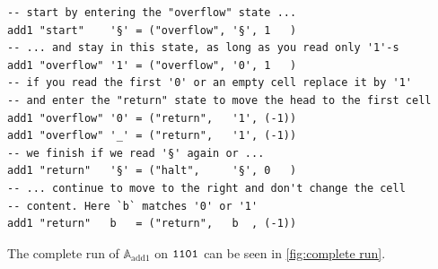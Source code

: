 \begin{lstlisting}
-- start by entering the "overflow" state ...
add1 "start"    '§' = ("overflow", '§', 1   )
-- ... and stay in this state, as long as you read only '1'-s
add1 "overflow" '1' = ("overflow", '0', 1   )
-- if you read the first '0' or an empty cell replace it by '1'
-- and enter the "return" state to move the head to the first cell
add1 "overflow" '0' = ("return",   '1', (-1))
add1 "overflow" '_' = ("return",   '1', (-1))
-- we finish if we read '§' again or ...
add1 "return"   '§' = ("halt",     '§', 0   )
-- ... continue to move to the right and don't change the cell
-- content. Here `b` matches '0' or '1'
add1 "return"   b   = ("return",   b  , (-1))
\end{lstlisting}

The complete run of $\mathbb A_\text{add1}$ on $\mathtt 1\mathtt 1\mathtt 0\mathtt 1$
can be seen in \cref{fig:complete run}.


